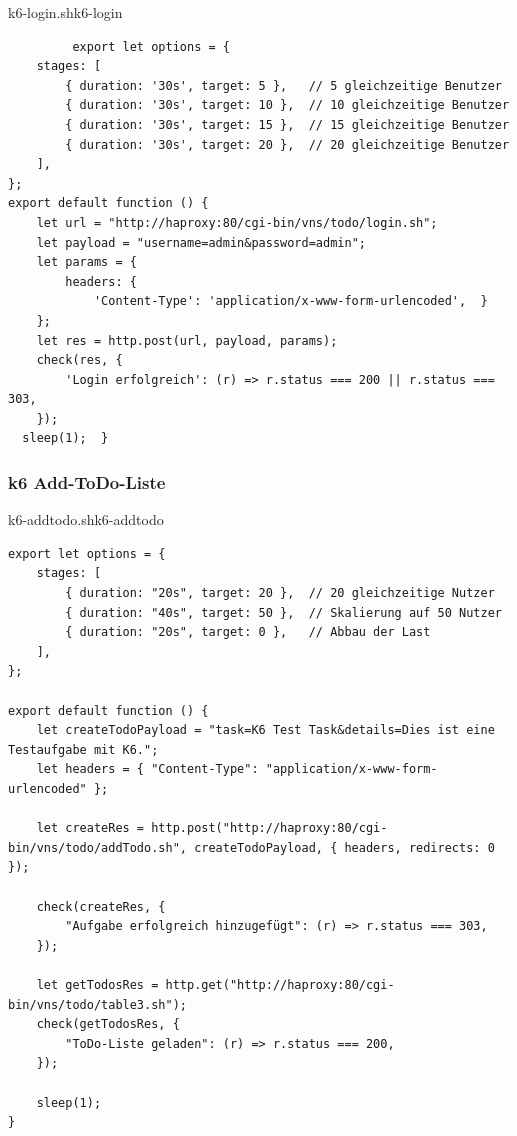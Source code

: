 \begin{code}{k6-login.sh}{k6-login}
        \begin{verbatim}
         export let options = {
    stages: [
        { duration: '30s', target: 5 },   // 5 gleichzeitige Benutzer
        { duration: '30s', target: 10 },  // 10 gleichzeitige Benutzer
        { duration: '30s', target: 15 },  // 15 gleichzeitige Benutzer
        { duration: '30s', target: 20 },  // 20 gleichzeitige Benutzer
    ],
};
export default function () {
    let url = "http://haproxy:80/cgi-bin/vns/todo/login.sh";
    let payload = "username=admin&password=admin";
    let params = {
        headers: {
            'Content-Type': 'application/x-www-form-urlencoded',  }
    };
    let res = http.post(url, payload, params);
    check(res, {
        'Login erfolgreich': (r) => r.status === 200 || r.status === 303,
    });
  sleep(1);  } 
         \end{verbatim}
\end{code}

\subsubsection{k6 Add-ToDo-Liste}

\begin{code}{k6-addtodo.sh}{k6-addtodo}
        \begin{verbatim}
export let options = {
    stages: [
        { duration: "20s", target: 20 },  // 20 gleichzeitige Nutzer
        { duration: "40s", target: 50 },  // Skalierung auf 50 Nutzer
        { duration: "20s", target: 0 },   // Abbau der Last
    ],
};

export default function () {
    let createTodoPayload = "task=K6 Test Task&details=Dies ist eine Testaufgabe mit K6.";
    let headers = { "Content-Type": "application/x-www-form-urlencoded" };

    let createRes = http.post("http://haproxy:80/cgi-bin/vns/todo/addTodo.sh", createTodoPayload, { headers, redirects: 0 });

    check(createRes, {
        "Aufgabe erfolgreich hinzugefügt": (r) => r.status === 303,
    });

    let getTodosRes = http.get("http://haproxy:80/cgi-bin/vns/todo/table3.sh");
    check(getTodosRes, {
        "ToDo-Liste geladen": (r) => r.status === 200,
    });

    sleep(1);
}
        \end{verbatim}
\end{code}

